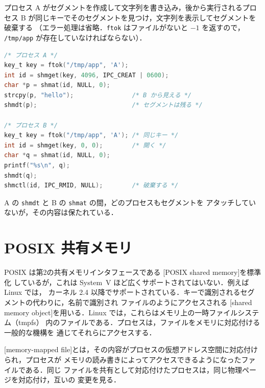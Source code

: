 \documentclass[../main.tex]{subfiles}
\begin{document}
\begin{example}
  \label{ex:l09-sysv}
  プロセス A がセグメントを作成して文字列を書き込み，後から実行されるプロセス
  B が同じキーでそのセグメントを見つけ，文字列を表示してセグメントを破棄する
  （エラー処理は省略．\texttt{ftok} はファイルがないと $-1$ を返すので，
  \texttt{/tmp/app} が存在していなければならない）．
  \begin{lstlisting}[language=C, numbers=none]
/* プロセス A */
key_t key = ftok("/tmp/app", 'A');
int id = shmget(key, 4096, IPC_CREAT | 0600);
char *p = shmat(id, NULL, 0);
strcpy(p, "hello");                /* B から見える */
shmdt(p);                          /* セグメントは残る */

/* プロセス B */
key_t key = ftok("/tmp/app", 'A'); /* 同じキー */
int id = shmget(key, 0, 0);        /* 開く */
char *q = shmat(id, NULL, 0);
printf("%s\n", q);
shmdt(q);
shmctl(id, IPC_RMID, NULL);        /* 破棄する */
\end{lstlisting}
  A の \texttt{shmdt} と B の \texttt{shmat} の間，どのプロセスもセグメントを
  アタッチしていないが，その内容は保たれている．
\end{example}

\section{POSIX 共有メモリ}
\label{sec:l09-posix}

POSIX は第2の共有メモリインタフェースである
[POSIX shared memory]を標準化
しているが，これは System~V ほど広くサポートされてはいない．例えば Linux では，
カーネル 2.4 以降でサポートされている．キーで識別されるセグメントの代わりに，名前で識別され
ファイルのようにアクセスされる
[shared memory
object]を用いる．Linux では，これらはメモリ上の一時ファイルシステム（tmpfs）
内のファイルである．プロセスは，ファイルをメモリに対応付ける一般的な機構を
通じてそれらにアクセスする．

\begin{definition}[メモリマップドファイル]
  [memory-mapped
  file]とは，その内容がプロセスの仮想アドレス空間に対応付けられ，プロセスが
  メモリの読み書きによってアクセスできるようになったファイルである．同じ
  ファイルを共有として対応付けたプロセスは，同じ物理ページを対応付け，互いの
  変更を見る．
\end{definition}
\end{document}
